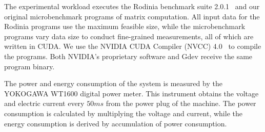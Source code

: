 The experimental workload executes the Rodinia benchmark suite
2.0.1~\cite{Che2010} and our original microbenchmark programs of matrix
computation.
All input data for the Rodinia programs use the maximum feasible size,
while the microbenchmark programs vary data size to conduct fine-grained
measurements, all of which are written in CUDA.
We use the NVIDIA CUDA Compiler (NVCC) 4.0~\cite{CUDA40} to compile the
programs.
Both NVIDIA's proprietary software and Gdev receive the same program
binary.

The power and energy consumption of the system is measured by the
YOKOGAWA WT1600 digital power meter.
This instrument obtains the voltage and electric current every $50ms$
from the power plug of the machine.
The power consumption is calculated by multiplying the voltage and
current, while the energy consumption is derived by accumulation of
power consumption.
